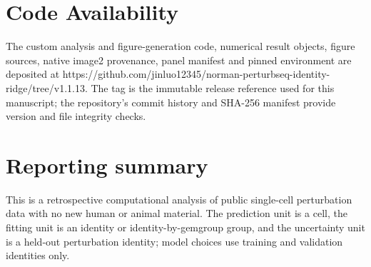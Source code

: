 \documentclass[10pt]{article}
\begin{document}
\section{Code Availability}
The custom analysis and figure-generation code, numerical result objects, figure sources, native image2 provenance, panel manifest and pinned environment are deposited at https://github.com/jinluo12345/norman-perturbseq-identity-ridge/tree/v1.1.13. The tag is the immutable release reference used for this manuscript; the repository's commit history and SHA-256 manifest provide version and file integrity checks.

\section{Reporting summary}
This is a retrospective computational analysis of public single-cell perturbation data with no new human or animal material. The prediction unit is a cell, the fitting unit is an identity or identity-by-gemgroup group, and the uncertainty unit is a held-out perturbation identity; model choices use training and validation identities only.
\end{document}
